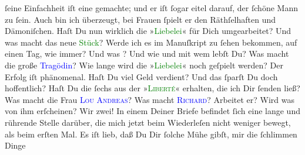               ſeine Einfachheit  iſt eine gemachte; und er
               iſt ſogar eitel darauf, der ſchöne Mann zu ſein. Auch bin ich überzeugt, bei  Frauen ſpielt er den Räthſelhaften und
               Dämoniſchen.\pend
           \pstart
           Haſt Du nun wirklich die »\textcolor{green}{Liebelei}{}\ledrightnote{\textcolor{green}{Liebelei. Schauspiel in drei Akten}}« für Dich
               umgearbeitet? Und was macht das neue \textcolor{green}{Stück}{}? Werde ich es im Manuſkript zu ſehen
               bekommen, auf {\pb}einen Tag, wie immer? Und was \label{K_L02758-6v}\label{K_L02758-6h}? Und wie und
               mit wem lebſt Du? Was macht die große \textcolor{blue}{Tragödin}{}? Wie lange wird die »\textcolor{green}{Liebelei}{}\ledrightnote{\textcolor{green}{Liebelei. Schauspiel in drei Akten}}« noch geſpielt werden? Der Erfolg iſt phänomenal.
               Haſt Du viel Geld verdient? Und das ſparſt Du doch hoffentlich? Haſt Du die ſechs
                  \label{K_L02758-88v}\label{K_L02758-88h} aus der »\textsc{\textcolor{green}{Liberté}{}\ledrightnote{\textcolor{green}{La Liberté}}}« erhalten, die ich Dir ſenden
               ließ? Was macht die Frau \textsc{\textcolor{blue}{Lou Andreas}{}\ledrightnote{\textcolor{blue}{Lou Andreas-Salomé}}}? Was {\pb}macht \textsc{\textcolor{blue}{Richard}{}\ledrightnote{\textcolor{blue}{Richard Beer-Hofmann}}}? Arbeitet er? Wird was von ihm erſcheinen?{\dotsfive}\pend
           \pstart
           Wir zwei! In einem Deiner Briefe befindet ſich eine lange und rührende Stelle
               darüber, die mich jetzt beim Wiederleſen nicht weniger bewegt, als beim  erſten Mal. Es iſt lieb, daß Du Dir ſolche Mühe gibſt, mir die ſchlimmen Dinge
